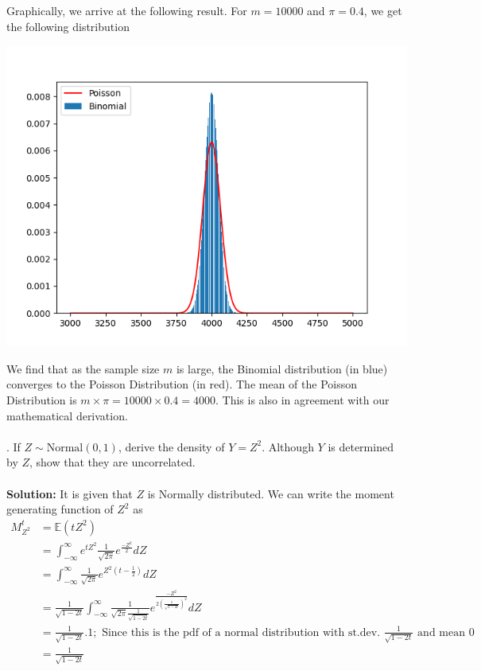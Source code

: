 \documentclass[11pt]{article}
\begin{document}
Graphically, we arrive at the following result. For $m = 10000$ and $\pi = 0.4$, we get the following distribution
\begin{center}
  \includegraphics[width=\textwidth]{binompoisson.png}
\end{center}
We find that as the sample size $m$ is large, the Binomial distribution (in blue) converges to the Poisson Distribution (in red). The mean of the Poisson Distribution is $m \times \pi = 10000 \times 0.4 = 4000$. This is also in agreement with our mathematical derivation. \\ \\
. If $Z \sim \text{Normal}(0,1)$, derive the density of $Y = Z^{2}$. Although $Y$ is determined by $Z$, show that they are uncorrelated.\\ \\
\textbf{Solution:} It is given that $Z$ is Normally distributed. We can write the moment generating function of $Z^{2}$ as
\begin{equation}
  \nonumber
  \begin{aligned}
    M_{Z^{2}}^{t} & = \mathbb{E}(tZ^{2})\\
    & = \int_{-\infty}^{\infty}e^{tZ^{2}}\frac{1}{\sqrt{2\pi}}e^{\frac{-Z^{2}}{2}}dZ\\
    & = \int_{-\infty}^{\infty}\frac{1}{\sqrt{2\pi}}e^{Z^{2}(t - \frac{1}{2})}dZ\\
    & = \frac{1}{\sqrt{1-2t}}\int_{-\infty}^{\infty}\frac{1}{\sqrt{2\pi}\frac{1}{\sqrt{1-2t}}}e^{\frac{-Z^{2}}{2(\frac{1}{\sqrt{1-2t}})^{2}}}dZ\\
    & = \frac{1}{\sqrt{1-2t}}.1; \text{ Since this is the pdf of a normal distribution with st.dev. $\frac{1}{\sqrt{1-2t}}$ and mean 0}\\
    & = \frac{1}{\sqrt{1-2t}}
  \end{aligned}
\end{equation}
\end{document}
